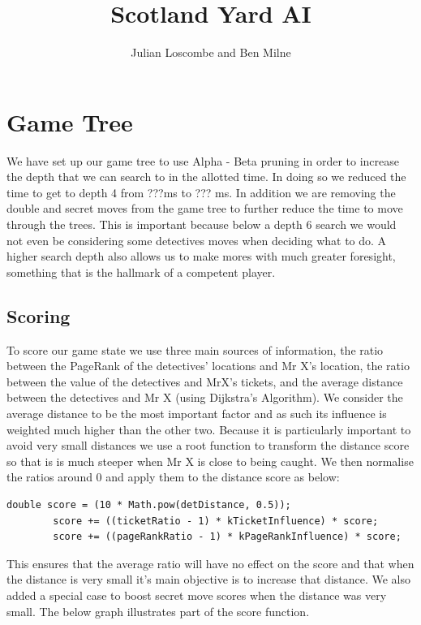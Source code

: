 \documentclass[a4paper, 12pt]{article}
\title{Scotland Yard AI}
\author{Julian Loscombe and Ben Milne}
\begin{document}
\maketitle
\section{Game Tree}
We have set up our game tree to use Alpha - Beta pruning in order to increase the depth that we can search to in the allotted time. In doing so we reduced the time to get to depth 4 from ???ms to ??? ms. In addition we are removing the double and secret moves from the game tree to further reduce the time to move through the trees. This is important because below a depth 6 search we would not even be considering some detectives moves when deciding what to do. A higher search depth also allows us to make mores with much greater foresight, something that is the hallmark of a competent player.
\subsection{Scoring}
To score our game state we use three main sources of information, the ratio between the PageRank of the detectives' locations and Mr X's location, the ratio between the value of the detectives and MrX's tickets, and the average distance between the detectives and Mr X (using Dijkstra's Algorithm). We consider the average distance to be the most important factor and as such its influence is weighted much higher than the other two. Because it is particularly important to avoid very small distances we use a root function to transform the distance score so that is is much steeper when Mr X is close to being caught. We then normalise the ratios around 0 and apply them to the distance score as below:
\begin{lstlisting}
double score = (10 * Math.pow(detDistance, 0.5));
        score += ((ticketRatio - 1) * kTicketInfluence) * score;
        score += ((pageRankRatio - 1) * kPageRankInfluence) * score;
\end{lstlisting}
This ensures that the average ratio will have no effect on the score and that when the distance is very small it's main objective is to increase that distance. We also added a special case to boost secret move scores when the distance was very small. The below graph illustrates part of the score function.
\end{document}
